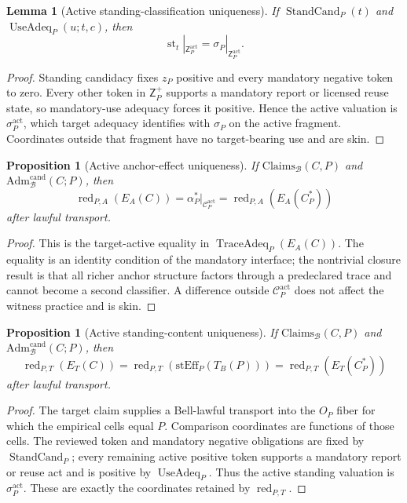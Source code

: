 \documentclass[11pt]{article}
\newtheorem{proposition}[theorem]{Proposition}
\newtheorem{lemma}[theorem]{Lemma}
\theoremstyle{definition}
\newcommand{\Bell}{\mathcal{B}}
\newcommand{\AdmBell}{\mathrm{Adm}^{\mathrm{cand}}_{\Bell}}
\newcommand{\ClaimsBell}{\mathrm{Claims}_{\Bell}}
\newcommand{\StandEff}{\mathrm{stEff}_{P}}
\newcommand{\CanonC}{C^{*}_{P}}
\newcommand{\Active}{\mathrm{act}}
\begin{document}
\begin{lemma}[Active standing-classification uniqueness]\label{lem:activestandinguniqueness}
If $\operatorname{StandCand}_P(t)$ and $\operatorname{UseAdeq}_P(u;t,c)$, then
\[
\operatorname{st}_t|_{\mathsf Z_P^{\Active}}
=\sigma_P|_{\mathsf Z_P^{\Active}}.
\]
\end{lemma}
\begin{proof}
Standing candidacy fixes $z_P$ positive and every mandatory negative token to zero. Every other token in $\mathsf Z_P^{+}$ supports a mandatory report or licensed reuse state, so mandatory-use adequacy forces it positive. Hence the active valuation is $\sigma_P^{\Active}$, which target adequacy identifies with $\sigma_P$ on the active fragment. Coordinates outside that fragment have no target-bearing use and are skin.
\end{proof}

\begin{proposition}[Active anchor-effect uniqueness]\label{prop:anchoruniqueness}
If $\ClaimsBell(C,P)$ and $\AdmBell(C;P)$, then
\[
\operatorname{red}_{P,A}(E_A(C))
=\alpha_P^*|_{\mathcal C_P^{\Active}}
=\operatorname{red}_{P,A}(E_A(\CanonC))
\]
after lawful transport.
\end{proposition}
\begin{proof}
This is the target-active equality in $\operatorname{TraceAdeq}_P(E_A(C))$. The equality is an identity condition of the mandatory interface; the nontrivial closure result is that all richer anchor structure factors through a predeclared trace and cannot become a second classifier. A difference outside $\mathcal C_P^{\Active}$ does not affect the witness practice and is skin.
\end{proof}

\begin{proposition}[Active standing-content uniqueness]\label{prop:tensoruniqueness}
If $\ClaimsBell(C,P)$ and $\AdmBell(C;P)$, then
\[
\operatorname{red}_{P,T}(E_T(C))
=\operatorname{red}_{P,T}(\StandEff(T_B(P)))
=\operatorname{red}_{P,T}(E_T(\CanonC))
\]
after lawful transport.
\end{proposition}
\begin{proof}
The target claim supplies a Bell-lawful transport into the $O_P$ fiber for which the empirical cells equal $P$. Comparison coordinates are functions of those cells. The reviewed token and mandatory negative obligations are fixed by $\operatorname{StandCand}_P$; every remaining active positive token supports a mandatory report or reuse act and is positive by $\operatorname{UseAdeq}_P$. Thus the active standing valuation is $\sigma_P^{\Active}$. These are exactly the coordinates retained by $\operatorname{red}_{P,T}$.
\end{proof}
\end{document}
